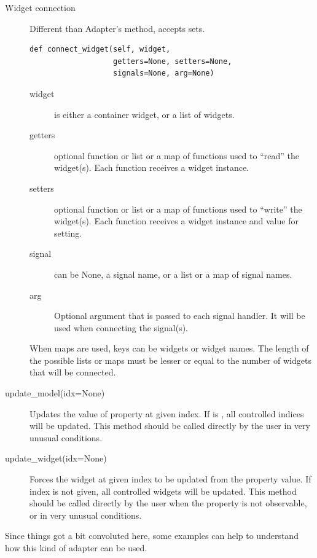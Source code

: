 \begin{description}

\item [Widget connection] Different than Adapter's method,
   accepts sets.

{ 
\codesize
\begin{verbatim}
def connect_widget(self, widget,
                   getters=None, setters=None, 
                   signals=None, arg=None)
\end{verbatim}
}

\begin{description}

\item [widget] is either a container widget, or a list of widgets. 
\item[getters] optional function or list or a map of functions used
  to ``read'' the widget(s). Each function receives a widget
  instance.
\item[setters] optional function or list or a map of functions used
  to ``write'' the widget(s). Each function receives a widget
  instance and value for setting.

\item[signal] can be None, a signal name, or a list or a map of
  signal names.

\item[arg] Optional argument that is passed to each signal
  handler. It will be used when connecting the signal(s). 
\end{description}

When maps are used, keys can be widgets or widget names. The length
of the possible lists or maps must be lesser or equal to the number
of widgets that will be connected.

\item[update\_model(idx=None)] Updates the value of property at
  given index. If  is , all controlled
  indices will be updated. This method should be called directly by
  the user in very unusual conditions.

\item[update\_widget(idx=None)] Forces the widget at given index to
  be updated from the property value. If index is not given, all
  controlled widgets will be updated. This method should be called
  directly by the user when the property is not observable, or in
  very unusual conditions.
\end{description}

Since things got a bit convoluted here, some examples can help to
understand how this kind of adapter can be used. 


